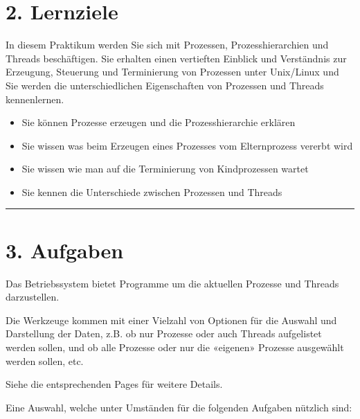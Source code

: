 \documentclass[a4paper,10pt,english]{report}
\begin{document}
\section{2. Lernziele}
\label{\detokenize{P07_Prozesse_und_Threads/README:lernziele}}
\sphinxAtStartPar
In diesem Praktikum werden Sie sich mit Prozessen, Prozesshierarchien und Threads beschäftigen. Sie erhalten einen vertieften Einblick und Verständnis zur Erzeugung, Steuerung und Terminierung von Prozessen unter Unix/Linux und Sie werden die unterschiedlichen Eigenschaften von Prozessen und Threads kennenlernen.
\begin{itemize}
\item {} 
\sphinxAtStartPar
Sie können Prozesse erzeugen und die Prozesshierarchie erklären

\item {} 
\sphinxAtStartPar
Sie wissen was beim Erzeugen eines Prozesses vom Elternprozess vererbt wird

\item {} 
\sphinxAtStartPar
Sie wissen wie man auf die Terminierung von Kindprozessen wartet

\item {} 
\sphinxAtStartPar
Sie kennen die Unterschiede zwischen Prozessen und Threads

\end{itemize}


\bigskip\hrule\bigskip



\section{3. Aufgaben}
\label{\detokenize{P07_Prozesse_und_Threads/README:aufgaben}}
\sphinxAtStartPar
Das Betriebssystem bietet Programme um die aktuellen Prozesse und Threads darzustellen.

\sphinxAtStartPar
Die Werkzeuge kommen mit einer Vielzahl von Optionen für die Auswahl und Darstellung der Daten, z.B. ob nur Prozesse oder auch Threads aufgelistet werden sollen, und ob alle Prozesse oder nur die «eigenen» Prozesse ausgewählt werden sollen, etc.

\sphinxAtStartPar
Siehe die entsprechenden  Pages für weitere Details.

\sphinxAtStartPar
Eine Auswahl, welche unter Umständen für die folgenden Aufgaben nützlich sind:
\end{document}
